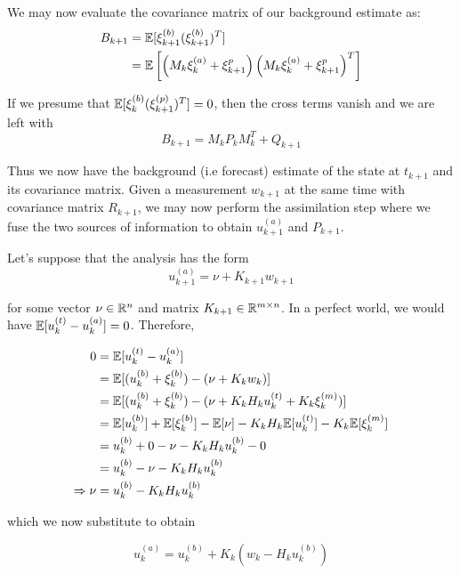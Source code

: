 We may now evaluate the covariance matrix of our background estimate as:
\begin{align}
    B_{k+1} &= \mathbb{E}[\xi_{k+1}^{(b)}(\xi_{k+1}^{(b)})^T] \\
    &= \mathbb{E}\left[\left(M_k\xi_k^{(a)} + \xi_{k+1}^p \right) \left(M_k\xi_k^{(a)} + \xi_{k+1}^p \right)^T \right] \\
\end{align}

If we presume that $\mathbb{E}[\xi_k^{(b)}(\xi_{k+1}^{(p)})^T] = 0$, then the cross terms vanish and we are left with
\begin{equation}
    \boxed{B_{k+1} = M_kP_kM_k^T + Q_{k+1}}
\end{equation}

Thus we now have the background (i.e forecast) estimate of the state at $t_{k+1}$ and its covariance matrix. Given a measurement $w_{k+1}$ at the same time with covariance matrix $R_{k+1}$, we may now perform the assimilation step where we fuse the two sources of information to obtain $u_{k+1}^{(a)}$ and $P_{k+1}$.

Let's suppose that the analysis has the form
\begin{equation}
    u_{k+1}^{(a)} = \nu + K_{k+1}w_{k+1}
\end{equation}

for some vector $\nu\in\mathbb{R}^n$ and matrix $K_{k+1}\in\mathbb{R}^{m\times n}$. In a perfect world, we would have $\mathbb{E}[u_{k}^{(t)}-u_{k}^{(a)}] = 0$. Therefore,

\begin{align}
    0 &= \mathbb{E}[u_k^{(t)} - u_k^{(a)}] \\
    &= \mathbb{E}[(u_k^{(b)} + \xi_k^{(b)}) - (\nu + K_kw_k)] \\
    &= \mathbb{E}[(u_k^{(b)} + \xi_k^{(b)}) - (\nu + K_kH_ku_k^{(t)} + K_k\xi_k^{(m)})] \\
    &= \mathbb{E}[u_k^{(b)}] + \mathbb{E}[\xi_k^{(b)}] - \mathbb{E}[\nu] -K_kH_k\mathbb{E}[u_k^{(t)}] - K_k\mathbb{E}[\xi_k^{(m)}]\\
    &= u_k^{(b)} + 0 - \nu - K_kH_ku_k^{(b)} - 0 \\
    &= u_k^{(b)} - \nu - K_kH_ku_k^{(b)} \\
    \Rightarrow \nu &= u_k^{(b)} - K_kH_ku_k^{(b)}
\end{align}

which we now substitute to obtain

\begin{equation}
    \boxed{u_k^{(a)} = u_k^{(b)} + K_k(w_k - H_ku_k^{(b)})}
\end{equation}

